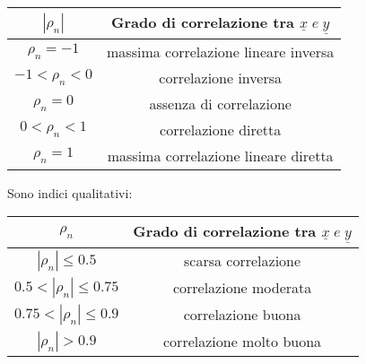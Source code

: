 \documentclass[a4paper]{article}
\theoremstyle{break}
\theoremstyle{break}
\theoremstyle{break}
\theoremstyle{break}
\begin{document}
\begin{table}[H]
	\centering
	\begin{tabular}{|c|c|}
		\hline
		\( | \rho_n | \)      & Grado di correlazione tra \( \underline{x}\;e\;\underline{y} \) \\
		\hline
		\( \rho_n = -1 \)     & massima correlazione lineare inversa                            \\
		\( -1 < \rho_n < 0 \) & correlazione inversa                                            \\
		\( \rho_n = 0 \)      & assenza di correlazione                                         \\
		\( 0 < \rho_n < 1 \)  & correlazione diretta                                            \\
		\( \rho_n = 1 \)      & massima correlazione lineare diretta                            \\
		\hline
	\end{tabular}
\end{table}
Sono indici qualitativi:
\begin{table}[H]
	\centering
	\begin{tabular}{|c|c|}
		\hline
		\( \rho_n \)                    & Grado di correlazione tra \( \underline{x}\;e\;\underline{y} \) \\
		\hline
		\( | \rho_n | \le 0.5 \)        & scarsa correlazione                                             \\
		\( 0.5 < | \rho_n | \le 0.75 \) & correlazione moderata                                           \\
		\( 0.75 < | \rho_n | \le 0.9 \) & correlazione buona                                              \\
		\( | \rho_n | > 0.9 \)          & correlazione molto buona                                        \\
		\hline
	\end{tabular}
\end{table}
\end{document}
